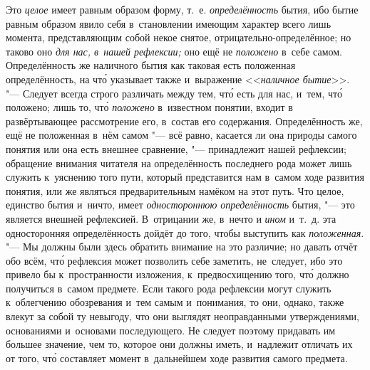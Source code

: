 \label{bkm:bm25a}Это {\em целое} имеет равным образом форму, т.~е.
{\em определённость} бытия, ибо бытие равным образом явило себя в~становлении
имеющим характер всего лишь момента, представляющим собой некое снятое,
отрицательно-определённое; но таково
оно {\em для нас, в~нашей рефлексии;} оно ещё не {\em положено} в~себе самом.
Определённость же наличного бытия как таковая есть положенная определённость,
на чт\'{о} указывает также и~выражение <<{\em наличное бытие}>>. "--- Следует
всегда строго различать между тем, чт\'{о} есть для нас, и~тем, чт\'{о}
положено; лишь то, чт\'{о} {\em положено} в~известном понятии, входит в
развёртывающее рассмотрение его, в~состав его содержания. Определённость же,
ещё не положенная в~нём самом "--- всё равно, касается ли она природы самого
понятия или она есть внешнее сравнение, "--- принадлежит нашей рефлексии;
обращение внимания читателя на определённость последнего рода может лишь
служить к~уяснению того пути, который представится нам в~самом ходе развития
понятия, или же являться предварительным намёком на этот путь. Что целое,
единство бытия и~ничто, имеет {\em одностороннюю определённость} бытия, "---
это является внешней рефлексией. В~отрицании же, в~нечто и {\em ином} и~т.~д.
эта односторонняя определённость дойдёт до того, чтобы выступить как
{\em положенная}. "--- Мы должны были здесь обратить внимание на это различие;
но давать отчёт обо всём, чт\'{о} рефлексия может позволить себе заметить,
не~следует, ибо это привело бы к~пространности изложения, к~предвосхищению
того, чт\'{о} должно получиться в~самом предмете. Если такого рода рефлексии
могут служить к~облегчению обозревания и~тем самым и~понимания, то они, однако,
также влекут за собой ту невыгоду, что они выглядят неоправданными
утверждениями, основаниями и~основами последующего. Не следует поэтому
придавать им большее значение, чем то, которое они должны иметь, и~надлежит
отличать их от того, чт\'{о} составляет момент в~дальнейшем ходе развития
самого предмета.

